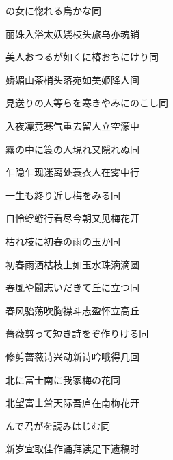 \begin{haiku}
    {\FH {}の女に惚れる烏かな}\hfill{\FH 同}

    {\FK 丽姝入浴太妖娆枝头旅乌亦魂销}
\end{haiku}

\begin{haiku}
    {\FH 美人おつるが如くに椿おちにけり}\hfill{\FH 同}

    {\FK 娇媚山茶梢头落宛如美姬降人间}
\end{haiku}

\begin{haiku}
    {\FH 見送りの人等らを寒きやみにのこし}\hfill{\FH 同}

    {\FK 入夜凜竞寒气重去留人立空濛中}
\end{haiku}

\begin{haiku}
    {\FH 霧の中に簑の人現れ又隠れぬ}\hfill{\FH 同}

    {\FK 乍隐乍现迷离处蓑衣人在雾中行}
\end{haiku}

\begin{haiku}
    {\FH 一生も終り近し梅をみる}\hfill{\FH 同}

    {\FK 自怜蜉蝣行看尽今朝又见梅花开}
\end{haiku}

\begin{haiku}
    {\FH 枯れ枝に初春の雨の玉か}\hfill{\FH 同}

    {\FK 初春雨洒枯枝上如玉水珠滴滴圆}
\end{haiku}

\begin{haiku}
    {\FH 春風や闘志いだきて丘に立つ}\hfill{\FH 同}

    {\FK 春风骀荡吹胸襟斗志盈怀立高丘}
\end{haiku}

\begin{haiku}
    {\FH 薔薇剪って短き詩をぞ作りける}\hfill{\FH 同}

    {\FK 修剪蔷薇诗兴动新诗吟哦得几回}
\end{haiku}

\begin{haiku}
    {\FH 北に富士南に我家梅の花}\hfill{\FH 同}

    {\FK 北望富士耸天际吾庐在南梅花开}
\end{haiku}

\begin{haiku}
    {\FH {}んで君がを読みはじむ}\hfill{\FH 同}

    {\FK 新岁宜取佳作诵拜读足下遗稿时}
\end{haiku}

